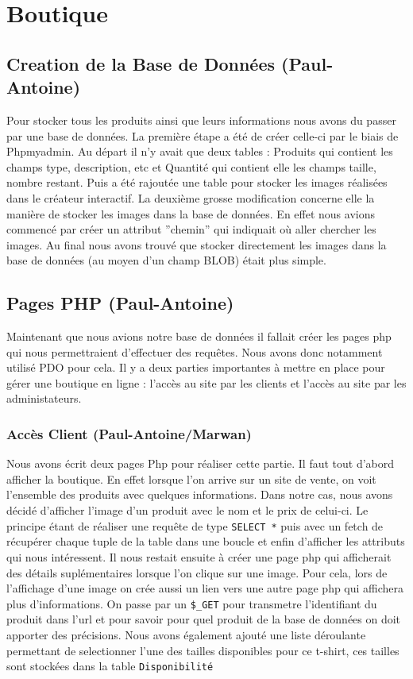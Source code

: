 \documentclass[french]{article}
\begin{document}
\section{Boutique}

\subsection{Creation de la Base de Données (Paul-Antoine)}
Pour stocker tous les produits ainsi que leurs informations nous avons du passer par une base de données. La première étape a été de créer celle-ci par le biais de Phpmyadmin. Au départ il n'y avait que deux tables : Produits qui contient les champs type, description, etc et Quantité qui contient elle les champs taille, nombre restant. Puis a été rajoutée une table pour stocker les images réalisées dans le créateur interactif. La deuxième grosse modification concerne elle la manière de stocker les images dans la base de données. En effet nous avions commencé par créer un attribut ''chemin'' qui indiquait où aller chercher les images. Au final nous avons trouvé que stocker directement les images dans la base de données (au moyen d'un champ BLOB) était plus simple.

\subsection{Pages PHP (Paul-Antoine)}
Maintenant que nous avions notre base de données il fallait créer les pages php qui nous permettraient d'effectuer des requêtes. Nous avons donc notamment utilisé PDO pour cela. Il y a deux parties importantes à mettre en place pour gérer une boutique en ligne : l'accès au site par les clients et l'accès au site par les administateurs.

\subsubsection{Accès Client (Paul-Antoine/Marwan)}
Nous avons écrit deux pages Php pour réaliser cette partie. Il faut tout d'abord afficher la boutique. En effet lorsque l'on arrive sur un site de vente, on voit l'ensemble des produits avec quelques informations. Dans notre cas, nous avons décidé d'afficher l'image d'un produit avec le nom et le prix de celui-ci. Le principe étant de réaliser une requête de type \verb|SELECT *| puis avec un fetch de récupérer chaque tuple de la table dans une boucle et enfin d'afficher les attributs qui nous intéressent. Il nous restait ensuite à créer une page php qui afficherait des détails suplémentaires lorsque l'on clique sur une image. Pour cela, lors de l'affichage d'une image on crée aussi un lien vers une autre page php qui affichera plus d'informations. On passe par un \verb|$_GET| pour transmetre l'identifiant du produit dans l'url et pour savoir pour quel produit de la base de données on doit apporter des précisions. 
Nous avons également ajouté une liste déroulante permettant de selectionner l'une des tailles disponibles pour ce t-shirt, ces tailles sont stockées dans la table \verb|Disponibilité|
\end{document}

